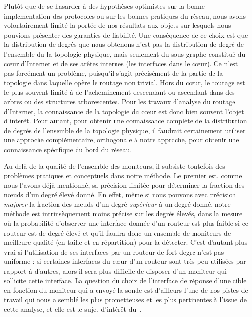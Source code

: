 Plutôt que de se hasarder à des hypothèses optimistes sur la bonne
implémentation des protocoles ou sur les bonnes pratiques du réseau, nous avons
volontairement limité la portée de nos résultats aux objets sur lesquels nous
pouvions présenter des garanties de fiabilité. Une conséquence de ce choix est
que la distribution de degrés que nous obtenons n'est pas la distribution de
degré de l'ensemble du la topologie physique, mais seulement du sous-graphe
constitué du c\oe{}ur d'Internet et de ses arêtes internes (les interfaces dans
le c\oe{}ur). Ce n'est pas forcément un problème, puisqu'il s'agit
précisément de la partie de la topologie dans laquelle opère le routage non
trivial. Hors du c\oe{}ur, le routage est le plus souvent limité à de
l'acheminement descendant ou ascendant dans des arbres ou des structures
arborescentes. Pour les travaux d'analyse du routage d'Internet, la
connaissance de la topologie du c\oe{}ur est donc bien souvent l'objet d'intérêt.
Pour autant, pour obtenir une connaissance complète de la distribution de degrés
de l'ensemble de la topologie physique, il faudrait certainement utiliser une
approche complémentaire, orthogonale à notre approche, pour obtenir une
connaissance spécifique du bord du réseau.

Au delà de la qualité de l'ensemble des moniteurs, il subsiste toutefois des
problèmes pratiques et conceptuels dans notre méthode. Le premier est, comme
nous l'avons déjà mentionné, sa précision limitée pour déterminer la fraction
des n\oe{}uds d'un degré élevé donné. En effet, même si nous pouvons avec précision
{\em majorer} la fraction des n\oe{}uds d'un degré {\em supérieur} à un degré
donné, notre méthode est intrinsèquement moins précise sur les degrés élevés,
dans la mesure où la probabilité d'observer une interface donnée d'un routeur
est \apriori plus faible si ce routeur est de degré élevé et qu'il faudra donc
un ensemble de moniteurs de meilleure qualité (en taille et en répartition) pour
la détecter. C'est d'autant plus vrai si l'utilisation de ses interfaces par un
routeur de fort degré n'est pas uniforme : si certaines interfaces du c\oe{}ur d'un
routeur sont très peu utilisées par rapport à d'autres, alors il sera plus
difficile de disposer d'un moniteur qui sollicite cette interface. La question
du choix de l'interface de réponse d'une cible en fonction du moniteur qui a
envoyé la sonde est d'ailleurs l'une de nos pistes de travail qui nous a semblé
les plus prometteuses et les plus pertinentes à l'issue de cette analyse, et
elle est le sujet d'intérêt du~.


